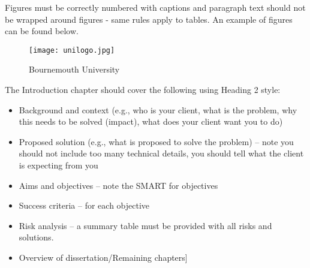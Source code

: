 	Figures must be correctly numbered with captions and paragraph text should not be wrapped around figures - same rules apply to tables. An example of figures can be found below.
	\begin{figure}[t]
		\centering
		\texttt{[image: unilogo.jpg]}
		\caption{Bournemouth University}
		\label{fig:BULogo1}
	\end{figure}
	The Introduction chapter should cover the following using Heading 2 style:
	\begin{itemize}
		\item Background and context (e.g., who is your client, what is the problem, why this needs to be solved (impact), what does your client want you to do)
		\item Proposed solution (e.g., what is proposed to solve the problem) – note you should not include too many technical details, you should tell what the client is expecting from you
		\item Aims and objectives – note the SMART for objectives
		\item Success criteria – for each objective
		\item Risk analysis – a summary table must be provided with all risks and solutions.
		\item Overview of dissertation/Remaining chapters]
	\end{itemize}
\fi

